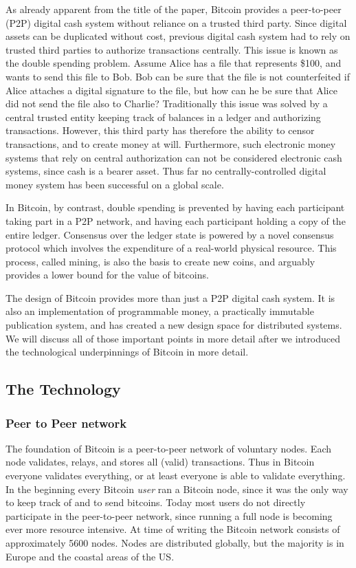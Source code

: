  As already apparent from the title of the paper, Bitcoin provides a peer-to-peer (P2P) digital cash system without reliance on a trusted third party. Since digital assets can be duplicated without cost, previous digital cash system had to rely on trusted third parties to authorize transactions centrally. This issue is known as the double spending problem. Assume Alice has a file that represents \$100, and wants to send this file to Bob. Bob can be sure that the file is not counterfeited if Alice attaches a digital signature to the file, but how can he be sure that Alice did not send the file also to Charlie? Traditionally this issue was solved by a central trusted entity keeping track of balances in a ledger and authorizing transactions. However, this third party has therefore the ability to censor transactions, and to create money at will. Furthermore, such electronic money systems that rely on central authorization can not be considered electronic cash systems, since cash is a bearer asset. Thus far no centrally-controlled digital money system has been successful on a global scale.

 In Bitcoin, by contrast, double spending is prevented by having each participant taking part in a P2P network, and having each participant holding a copy of the entire ledger. Consensus over the ledger state is powered by a novel consensus protocol which involves the expenditure of a real-world physical resource. This process, called mining, is also the basis to create new coins, and arguably provides a lower bound for the value of bitcoins.

 The design of Bitcoin provides more than just a P2P digital cash system. It is also an implementation of programmable money, a practically immutable publication system, and has created a new design space for distributed systems. We will discuss all of those important points in more detail after we introduced the technological underpinnings of Bitcoin in more detail.

\subsection{The Technology}
\label{sec:btc_tech}

\subsubsection{Peer to Peer network}
\label{sec:p2p}

The foundation of Bitcoin is a peer-to-peer network of voluntary nodes. Each node validates, relays, and stores all (valid) transactions. Thus in Bitcoin everyone validates everything, or at least everyone is able to validate everything. In the beginning every Bitcoin \emph{user} ran a Bitcoin node, since it was the only way to keep track of and to send bitcoins. Today most users do not directly participate in the peer-to-peer network, since running a full node is becoming ever more resource intensive. At time of writing the Bitcoin network consists of approximately 5600 nodes. Nodes are distributed globally, but the majority is in Europe and the coastal areas of the US. 

